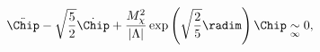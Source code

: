 \begin{equation}
\ddot{\Chip} -
\sqrt{5\over 2}
\dot{\Chip} +
\frac{M_\chi^2}{|\Lambda|} \exp\left(\sqrt{2\over 5} \radim\right)
\Chip \underset{\infty}{\sim} 0,
\label{eq:Chipasymp}
\end{equation}

